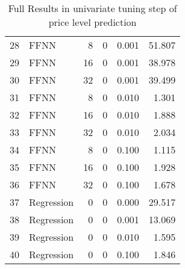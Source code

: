\begin{table}[ht]
\begin{tabular}{rlrrrr}
  28 & FFNN &    8 &    0 & 0.001 & 51.807 \\ 
  29 & FFNN &   16 &    0 & 0.001 & 38.978 \\ 
  30 & FFNN &   32 &    0 & 0.001 & 39.499 \\ 
  31 & FFNN &    8 &    0 & 0.010 & 1.301 \\ 
  32 & FFNN &   16 &    0 & 0.010 & 1.888 \\ 
  33 & FFNN &   32 &    0 & 0.010 & 2.034 \\ 
  34 & FFNN &    8 &    0 & 0.100 & 1.115 \\ 
  35 & FFNN &   16 &    0 & 0.100 & 1.928 \\ 
  36 & FFNN &   32 &    0 & 0.100 & 1.678 \\ 
  37 & Regression &    0 &    0 & 0.000 & 29.517 \\ 
  38 & Regression &    0 &    0 & 0.001 & 13.069 \\ 
  39 & Regression &    0 &    0 & 0.010 & 1.595 \\ 
  40 & Regression &    0 &    0 & 0.100 & 1.846 \\ 
   \hline
\end{tabular}
\caption{Full Results in univariate tuning step of price level prediction} 
\label{tab:level.par.tuning.full}
\end{table}
